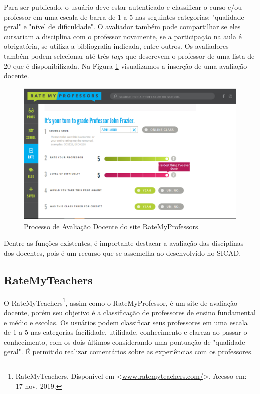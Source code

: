 \documentclass[12pt, a4paper]{report}
\begin{document}
Para ser publicado, o usuário deve estar autenticado e classificar o curso e/ou professor em uma escala de barra de 1 a 5 nas seguintes categorias: "qualidade geral" e "nível de dificuldade". O avaliador também pode compartilhar se eles cursariam a disciplina com o professor novamente, se a participação na aula é obrigatória, se utiliza a bibliografia indicada, entre outros. Os avaliadores também podem selecionar até três \textit{tags} que descrevem o professor de uma lista de 20 que é disponibilizada. Na Figura \ref{fig:ratemyprofessor} visualizamos a inserção de uma avaliação docente.
\begin{figure}
\centering
\includegraphics[scale=0.45]{ratemyprofessor.png}
\caption{Processo de Avaliação Docente do site RateMyProfessors.}
\label{fig:ratemyprofessor}
\end{figure}

Dentre as funções existentes, é importante destacar a avaliação das disciplinas dos docentes, pois é um recurso que se assemelha ao desenvolvido no SICAD.

\subsection{RateMyTeachers}

O RateMyTeachers\footnote{RateMyTeachers. Disponível em <\url{www.ratemyteachers.com/}>. Acesso em: 17 nov. 2019.}, assim como o RateMyProfessor, é um site de avaliação docente, porém seu objetivo é a classificação de professores de ensino fundamental e médio e escolas. Os usuários podem classificar seus professores em uma escala de 1 a 5 nas categorias facilidade, utilidade, conhecimento e clareza ao passar o conhecimento, com os dois últimos considerando uma pontuação de "qualidade geral". É permitido realizar comentários sobre as experiências com os professores.
\end{document}
